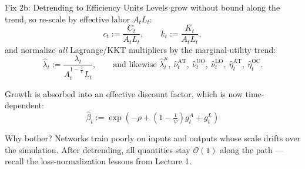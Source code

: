\documentclass[aspectratio=169,11pt]{beamer}
\newcommand{\emphc}[1]{\textcolor{harvardcrimson}{#1}}
\begin{document}
\begin{frame}{Fix 2b: Detrending to Efficiency Units}
\small
Levels grow without bound along the trend, so re-scale by effective labor $A_t L_t$:
\[
c_{t} := \frac{C_{t}}{A_{t}L_{t}}, \qquad k_{t} := \frac{K_{t}}{A_{t}L_{t}},
\]
and normalize \emph{all} Lagrange/KKT multipliers by the marginal-utility trend:
\[
\hat{\lambda}_{t} := \frac{\lambda_{t}}{A_{t}^{1-\frac{1}{\psi}}L_{t}}, \qquad
\text{and likewise } \hat{\lambda}^{\mu}_{t},\ \hat{\nu}^{\text{AT}}_{t},\ \hat{\nu}^{\text{UO}}_{t},\ \hat{\nu}^{\text{LO}}_{t},\ \hat{\eta}^{\text{AT}}_{t},\ \hat{\eta}^{\text{OC}}_{t}.
\]

Growth is absorbed into an \emphc{effective discount factor}, which is now time-dependent:
\[
\boxed{\;\hat{\beta}_t := \exp\left(-\rho + \left(1-\tfrac{1}{\psi}\right)g^{A}_{t} + g^{L}_{t}\right)\;}
\]

\begin{block}{Why bother?}
Networks train poorly on inputs and outputs whose scale drifts over the simulation. After detrending, all quantities stay $\mathcal{O}(1)$ along the path --- recall the loss-normalization lessons from Lecture 1.
\end{block}
\end{frame}
\end{document}
